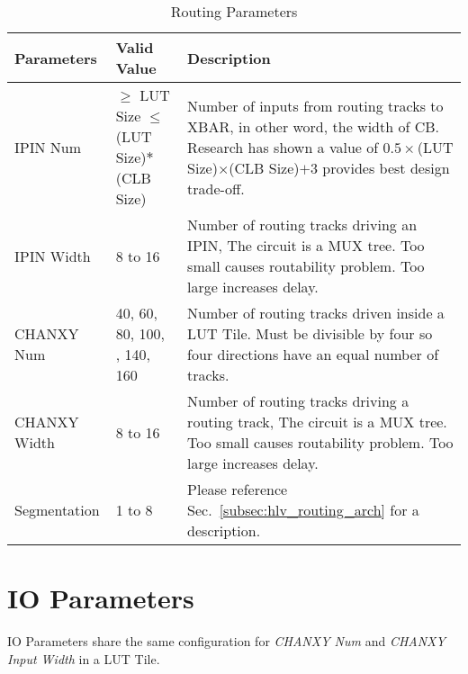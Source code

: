 \begin{table}[htpb]
		\begin{center}
				{\footnotesize
				{\tabulinesep=1.2mm
				\begin{tabu}{ | p{1.03in} | p{1.52in} | p{2.90in} |}    \hline
				Parameters & Valid Value & Description \\ \hline\hline
				
				IPIN Num & $\ge$ LUT Size \newline $\le$ (LUT Size)$*$(CLB Size) & 
						Number of inputs from routing tracks to XBAR, in other word, the width of CB.
						Research has shown a value of $0.5\times$(LUT Size)$\times$(CLB Size)$+3$ provides best design trade-off. \cite{655177} \\ \hline
																																		
				IPIN Width & 8 to 16 & Number of routing tracks driving an IPIN, The circuit is a MUX tree. Too small causes routability problem. Too large increases delay. \\ \hline
				
				CHANXY Num & 40, 60, 80, 100, , 140, 160 & Number of routing tracks driven inside a LUT Tile. Must be divisible by four so four directions have an equal number of tracks. \\ \hline
				
				CHANXY Width & 8 to 16 & Number of routing tracks driving a routing track, The circuit is a MUX tree. Too small causes routability problem. Too large increases delay. \\ \hline

				Segmentation & 1 to 8 & Please reference Sec.~\ref{subsec:hlv_routing_arch} for a description. \\ \hline
				
				\end{tabu}}}
				\caption{Routing Parameters
				\label{table:routing_params}}
		\end{center}
\end{table}

\clearpage

\section{IO Parameters}
\label{sec:io_param}

IO Parameters share the same configuration for \emph{CHANXY Num} and \emph{CHANXY Input Width} in a LUT Tile. \par

